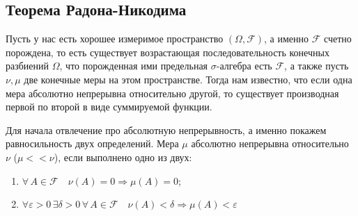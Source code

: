 \documentclass[12pt,a4paper]{article} %
\newcommand{\F}{\mathcal{F}}
\begin{document}
	\subsection{Теорема Радона-Никодима}
	Пусть у нас есть хорошее измеримое пространство $(\Omega,\F)$, а именно $\F$ счетно порождена, то есть существует возрастающая последовательность конечных разбиений $\Omega$, что порожденная ими предельная $\sigma$-алгебра есть $\F$, а также пусть $\nu,\mu$ две конечные меры на этом пространстве. Тогда нам известно, что если одна мера абсолютно непрерывна относительно другой, то существует производная первой по второй в виде суммируемой функции.
	
	Для начала отвлечение про абсолютную непрерывность, а именно покажем равносильность двух определений. Мера $\mu$ абсолютно непрерывна относительно $\nu$ ($\mu<<\nu$), если выполнено одно из двух:
	\begin{enumerate}
		\item $\forall\,A\in\F\quad\nu(A)=0\Rightarrow\mu(A)=0$;
		\item $\forall\varepsilon>0\,\exists\delta>0\,\forall\,A\in\F\quad\nu(A)<\delta\Rightarrow\mu(A)<\varepsilon$
	\end{enumerate}
\end{document}
